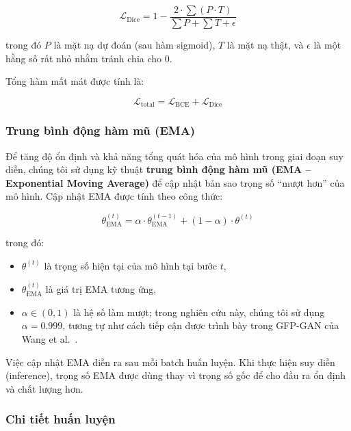 \documentclass[12pt,a4paper]{article}
\begin{document}
	\begin{equation}
		\mathcal{L}_{\text{Dice}} = 1 - \frac{2 \cdot \sum (P \cdot T)}{\sum P + \sum T + \epsilon}
	\end{equation}
	
	trong đó $P$ là mặt nạ dự đoán (sau hàm sigmoid), $T$ là mặt nạ thật, và $\epsilon$ là một hằng số rất nhỏ nhằm tránh chia cho 0.
	
	Tổng hàm mất mát được tính là:
	
	\begin{equation}
		\mathcal{L}_{\text{total}} = \mathcal{L}_{\text{BCE}} + \mathcal{L}_{\text{Dice}}
	\end{equation}
	
	\subsubsection*{Trung bình động hàm mũ (EMA)}
	
	Để tăng độ ổn định và khả năng tổng quát hóa của mô hình trong giai đoạn suy diễn, chúng tôi sử dụng kỹ thuật \textbf{trung bình động hàm mũ (EMA – Exponential Moving Average)} để cập nhật bản sao trọng số “mượt hơn” của mô hình. Cập nhật EMA được tính theo công thức:
	
	\begin{equation}
		\theta_{\text{EMA}}^{(t)} = \alpha \cdot \theta_{\text{EMA}}^{(t-1)} + (1 - \alpha) \cdot \theta^{(t)}
	\end{equation}
	
	trong đó:
	\begin{itemize}
		\item $\theta^{(t)}$ là trọng số hiện tại của mô hình tại bước $t$,
		\item $\theta_{\text{EMA}}^{(t)}$ là giá trị EMA tương ứng,
		\item $\alpha \in (0, 1)$ là hệ số làm mượt; trong nghiên cứu này, chúng tôi sử dụng $\alpha = 0.999$, tương tự như cách tiếp cận được trình bày trong GFP-GAN của Wang et al.~\cite{gfpgan}.
	\end{itemize}
	
	Việc cập nhật EMA diễn ra sau mỗi batch huấn luyện. Khi thực hiện suy diễn (inference), trọng số EMA được dùng thay vì trọng số gốc để cho đầu ra ổn định và chất lượng hơn.
	
	\subsubsection*{Chi tiết huấn luyện}
	
\end{document}
